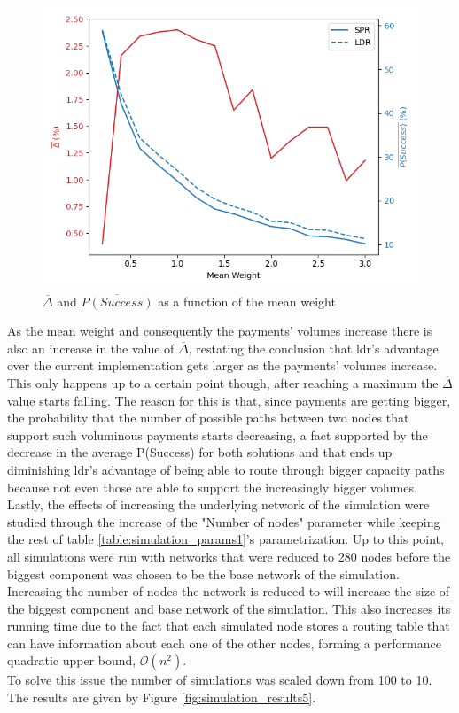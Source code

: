 \begin{figure}[H]
\begin{center}
  \includegraphics[width=\linewidth]{images/simulation_results4.png}
  \caption{$\overline{\Delta}$ and  $\overline{P(Success)}$ as a function of the mean weight}
  \label{fig:simulation_results4}
  \end{center}
\end{figure}

As the mean weight and consequently the payments' volumes increase there is also an increase in the value of $\overline{\Delta}$, restating the conclusion that \acrshort{ldr}'s advantage over the current implementation gets larger as the payments' volumes increase. This only happens up to a certain point though, after reaching a maximum the $\overline{\Delta}$ value starts falling. The reason for this is that, since payments are getting bigger, the probability that the number of possible paths between two nodes that support such voluminous payments starts decreasing, a fact supported by the decrease in the average P(Success) for both solutions and that ends up diminishing \acrshort{ldr}'s advantage of being able to route through bigger capacity paths because not even those are able to support the increasingly bigger volumes.\\
Lastly, the effects of increasing the underlying network of the simulation were studied through the increase of the "Number of nodes" parameter while keeping the rest of table \ref{table:simulation_params1}'s parametrization. Up to this point, all simulations were run with networks that were reduced to 280 nodes before the biggest component was chosen to be the base network of the simulation. Increasing the number of nodes the network is reduced to will increase the size of the biggest component and base network of the simulation. This also increases its running time due to the fact that each simulated node stores a routing table that can have information about each one of the other nodes, forming a performance quadratic upper bound, $\mathcal{O}(n^2)$.\\
To solve this issue the number of simulations was scaled down from 100 to 10. The results are given by Figure \ref{fig:simulation_results5}.\\

